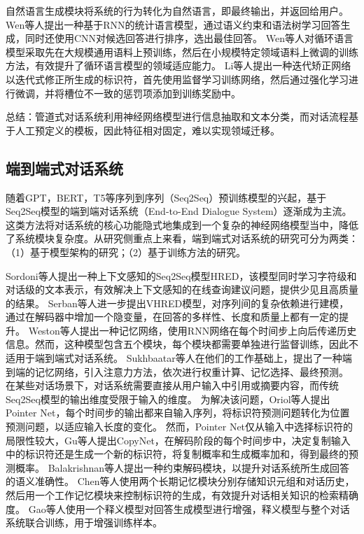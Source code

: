 自然语言生成模块将系统的行为转化为自然语言，即最终输出，并返回给用户。
Wen等人\cite{DBLP:conf/sigdial/WenGKMSVY15}提出一种基于RNN的统计语言模型，通过语义约束和语法树学习回答生成，同时还使用CNN对候选回答进行排序，选出最佳回答。
Wen等人\cite{DBLP:conf/naacl/WenGMRSVY16}对循环语言模型采取先在大规模通用语料上预训练，然后在小规模特定领域语料上微调的训练方法，有效提升了循环语言模型的领域适应能力。
Li等人\cite{DBLP:conf/acl/LiYQCLL20}提出一种迭代矫正网络以迭代式修正所生成的标识符，首先使用监督学习训练网络，然后通过强化学习进行微调，并将槽位不一致的惩罚项添加到训练奖励中。

总结：管道式对话系统利用神经网络模型进行信息抽取和文本分类，而对话流程基于人工预定义的模板，因此特征相对固定，难以实现领域迁移。

\subsection{端到端式对话系统}

随着GPT\cite{DBLP:conf/nips/BrownMRSKDNSSAA20}，BERT\cite{DBLP:conf/naacl/DevlinCLT19}，T5\cite{DBLP:journals/jmlr/RaffelSRLNMZLL20}等序列到序列（Seq2Seq）\cite{DBLP:conf/nips/SutskeverVL14,DBLP:conf/emnlp/ChoMGBBSB14}预训练模型的兴起，基于Seq2Seq模型的端到端对话系统（End-to-End Dialogue System）逐渐成为主流。这类方法将对话系统的核心功能隐式地集成到一个复杂的神经网络模型当中，降低了系统模块复杂度。从研究侧重点上来看，端到端式对话系统的研究可分为两类：（1）基于模型架构的研究；（2）基于训练方法的研究。

Sordoni等人\cite{DBLP:conf/cikm/SordoniBVLSN15}提出一种上下文感知的Seq2Seq模型HRED，该模型同时学习字符级和对话级的文本表示，有效解决上下文感知的在线查询建议问题，提供少见且高质量的结果。
Serban等人\cite{DBLP:conf/aaai/SerbanSLCPCB17}进一步提出VHRED模型，对序列间的复杂依赖进行建模，通过在解码器中增加一个隐变量，在回答的多样性、长度和质量上都有一定的提升。
Weston等人\cite{DBLP:journals/corr/WestonCB14}提出一种记忆网络，使用RNN网络在每个时间步上向后传递历史信息。然而，这种模型包含五个模块，每个模块都需要单独进行监督训练，因此不适用于端到端式对话系统。
Sukhbaatar等人\cite{DBLP:conf/nips/SukhbaatarSWF15}在他们的工作基础上，提出了一种端到端的记忆网络，引入注意力方法，依次进行权重计算、记忆选择、最终预测。
在某些对话场景下，对话系统需要直接从用户输入中引用或摘要内容，而传统Seq2Seq模型的输出维度受限于输入的维度。
为解决该问题，Oriol等人\cite{DBLP:conf/nips/VinyalsFJ15}提出Pointer Net，每个时间步的输出都来自输入序列，将标识符预测问题转化为位置预测问题，以适应输入长度的变化。
然而，Pointer Net仅从输入中选择标识符的局限性较大，Gu等人\cite{DBLP:conf/acl/GuLLL16}提出CopyNet，在解码阶段的每个时间步中，决定复制输入中的标识符还是生成一个新的标识符，将复制概率和生成概率加和，得到最终的预测概率。
Balakrishnan等人\cite{DBLP:conf/acl/BalakrishnanRUW19}提出一种约束解码模块，以提升对话系统所生成回答的语义准确性。
Chen等人\cite{DBLP:conf/acl/ChenXX19}使用两个长期记忆模块分别存储知识元组和对话历史，然后用一个工作记忆模块来控制标识符的生成，有效提升对话相关知识的检索精确度。
Gao等人\cite{DBLP:conf/acl/GaoZOY20}使用一个释义模型对回答生成模型进行增强，释义模型与整个对话系统联合训练，用于增强训练样本。

